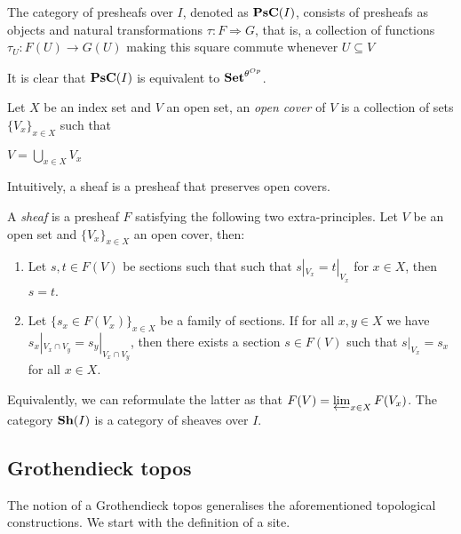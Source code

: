 \documentclass[a4paper]{article}
\theoremstyle{defin}
\theoremstyle{theorem}
\theoremstyle{claim}
\theoremstyle{prop}
\theoremstyle{lemma}
\theoremstyle{fact}
\theoremstyle{ex}
\theoremstyle{col}
\begin{document}
The category of presheafs over $I$, denoted as ${\bf PsC}(I)$, consists of presheafs as objects and natural transformations $\tau : F \Rightarrow G$, that is, a collection of functions $\tau_U : F(U) \to G(U)$ making this square commute whenever $U \subseteq V$


It is clear that ${\bf PsC}(I)$ is equivalent to ${\bf Set}^{\theta^{Op}}$.

Let $X$ be an index set and $V$ an open set, an \emph{open cover} of $V$ is a collection of sets $\{ V_x\}_{x \in X}$ such that
\begin{center}
$V = \bigcup \limits_{x \in X} V_x$
\end{center}

Intuitively, a sheaf is a presheaf that preserves open covers.

A \emph{sheaf} is a presheaf $F$ satisfying the following two extra-principles. Let $V$ be an open set and $\{V_x
\}_{x \in X}$ an open cover, then:
\begin{enumerate}
\item Let $s, t \in F(V)$ be sections such that such that $s|_{V_x} = t|_{V_x}$ for $x \in X$, then $s = t$.
\item Let $\{ s_x \in F(V_x) \}_{x \in X}$ be a family of sections. If for all $x, y \in X$ we have $s_x|_{V_x \cap V_y} = s_y|_{V_x \cap V_y}$, then there exists a section $s \in F(V)$ such that $s|_{V_x} = s_x$ for all $x \in X$.
\end{enumerate}
Equivalently, we can reformulate the latter as that $F(V) = \varprojlim_{x \in X} F(V_x)$.
The category ${\bf Sh}(I)$ is a category of sheaves over $I$.

\subsection{Grothendieck topos}

The notion of a Grothendieck topos generalises the aforementioned topological constructions. We start with the definition of a site.
\end{document}
